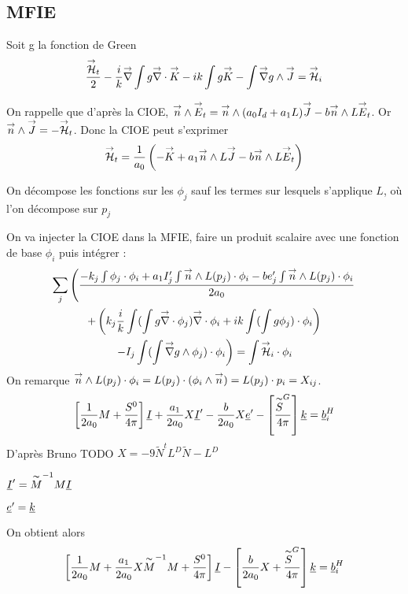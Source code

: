 \subsection{MFIE}
Soit g la fonction de Green
\[
  \frac{\vH_t}{2}-\frac{i}{k}\vgrad \int  g\vdiv\vK -  ik\int g\vK - \int \vgrad g \pvect \vJ = \vH_i
\]

On rappelle que d’après la CIOE, \(\vn \pvect \vE_t = \vn \pvect (a_0I_d+a_1L)\vJ -b\vn\pvect L\vE_t\). Or \(\vn\pvect \vJ = -\vH_t\). Donc la CIOE peut s'exprimer
\[
  \vH_t = \frac{1}{a_0}\left(-\vK + a_1 \vn\pvect L\vJ -b\vn\pvect L\vE_t\right)
\]

On décompose les fonctions sur les \(\phi_j\) sauf les termes sur lesquels s'applique \(L\), où l'on décompose sur \(p_j\) 

On va injecter la CIOE dans la MFIE, faire un produit scalaire avec une fonction de base \(\phi_i\) puis intégrer : 
\begin{multline}
  \sum_j \left(\frac{-k_j\int\phi_j\cdot\phi_i + a_1 I'_j \int \vn \pvect L (p_j) \cdot \phi_i  -be'_j\int \vn \pvect L(p_j)\cdot \phi_i}{2a_0} \right. \\
  +\left(k_j\frac{i}{k}\int (\int g\vdiv\phi_j)\vdiv \phi_i + ik\int (\int g\phi_j)\cdot \phi_i \right)\\
  \left. -  I_j\int(\int \vgrad g \pvect \phi_j) \cdot \phi_i \right)= \int \vH_i \cdot \phi_i
\end{multline}
On remarque \( \vn \pvect L(p_j)\cdot \phi_i = L(p_j)\cdot(\phi_i\pvect\vn) = L(p_j)\cdot p_i = X_{ij}\). 
\[
  \left[\frac{1}{2a_0}M + \frac{S^0}{4\pi}\right]\v I + \frac{a_1}{2a_0}X\v I' - \frac{b}{2a_0}X\v e' - \left[ \frac{\tilde S^G}{4\pi}\right]\v k = \v b_i^H
\]
D’après Bruno TODO \(X = -9\tilde N^tL^D\tilde N - L^D\) %

\(\v I' = \tilde M^{-1}M\v I\)

\(\v e' = \v k\)

On obtient alors 
\[
  \left[\frac{1}{2a_0}M + \frac{a_1}{2a_0}X\tilde M^{-1}M + \frac{S^0}{4\pi}\right]\v I - \left[\frac{b}{2a_0}X+ \frac{\tilde S^G}{4\pi}\right]\v k = \v b_i^H
\]

